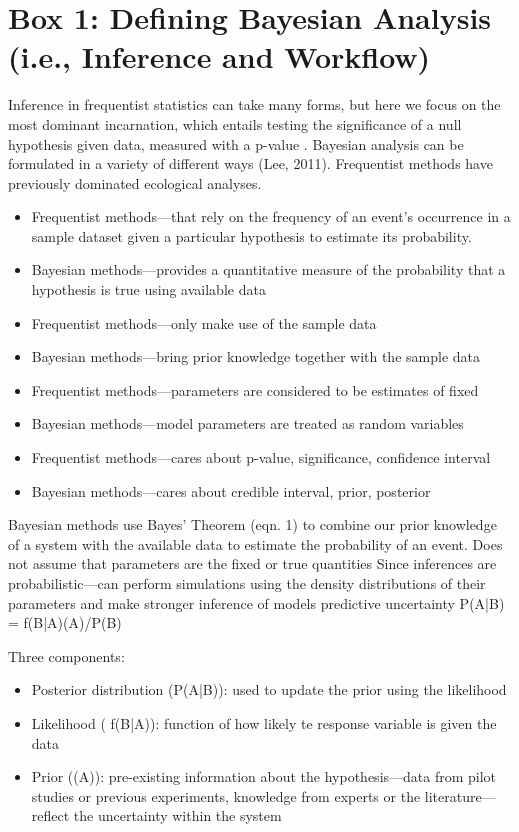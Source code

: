 \documentclass{article}
\begin{document}
\section* {Box 1: Defining Bayesian Analysis (i.e., Inference and Workflow)}
Inference in frequentist statistics can take many forms, but here we focus on the most dominant incarnation, which entails testing the significance of a null hypothesis given data, measured with a p-value \citep{Zyl2018}. Bayesian analysis can be formulated in a variety of different ways (Lee, 2011). Frequentist methods have previously dominated ecological analyses.
\begin{itemize}

\item Frequentist methods—that rely on the frequency of an event's occurrence in a sample dataset given a particular hypothesis to estimate its probability.
\item Bayesian methods—provides a quantitative measure of the probability that a hypothesis is true using available data
\item Frequentist methods—only make use of the sample data
\item Bayesian methods—bring prior knowledge together with the sample data
\item Frequentist methods—parameters  are considered to be estimates of fixed
\item Bayesian methods—model parameters are treated as random variables
\item Frequentist methods—cares about p-value, significance, confidence interval
\item Bayesian methods—cares about credible interval, prior, posterior
\end{itemize}
Bayesian methods use Bayes' Theorem (eqn. 1) to combine our prior knowledge of a system with the available data to estimate the probability of an event. 
Does not assume that parameters are the fixed or true quantities
Since inferences are probabilistic—can perform simulations using the density distributions of their parameters and make stronger inference of models predictive uncertainty
P(A|B) = f(B|A)(A)/P(B)
\par Three components:
\begin{itemize}
\item Posterior distribution (P(A|B)): used to update the prior using the likelihood
\item Likelihood ( f(B|A)): function of how likely te response variable is given the data
\item Prior ((A)): pre-existing information about the hypothesis—data from pilot studies or previous experiments, knowledge from experts or the literature—reflect the uncertainty within the system
\end{itemize}
\end{document}
